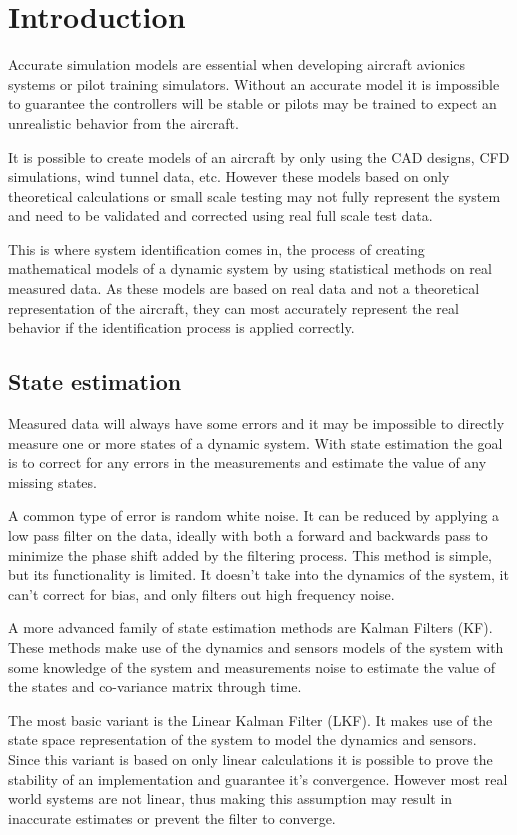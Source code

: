 \section{Introduction}
Accurate simulation models are essential when developing aircraft avionics systems or pilot training simulators. Without an accurate model it is impossible to guarantee the controllers will be stable or pilots may be trained to expect an unrealistic behavior from the aircraft.

It is possible to create models of an aircraft by only using the CAD designs, CFD simulations, wind tunnel data, etc. However these models based on only theoretical calculations or small scale testing may not fully represent the system and need to be validated and corrected using real full scale test data. 

This is where system identification comes in, the process of creating mathematical models of a dynamic system by using statistical methods on real measured data. As these models are based on real data and not a theoretical representation of the aircraft, they can most accurately represent the real behavior if the identification process is applied correctly.

\subsection{State estimation}
Measured data will always have some errors and it may be impossible to directly measure one or more states of a dynamic system. With state estimation the goal is to correct for any errors in the measurements and estimate the value of any missing states. 

A common type of error is random white noise. It can be reduced by applying a low pass filter on the data, ideally with both a forward and backwards pass to minimize the phase shift added by the filtering process. This method is simple, but its functionality is limited. It doesn't take into the dynamics of the system, it can't correct for bias, and only filters out high frequency noise.

A more advanced family of state estimation methods are Kalman Filters (KF). These methods make use of the dynamics and sensors models of the system with some knowledge of the system and measurements noise to estimate the value of the states and co-variance matrix through time.

The most basic variant is the Linear Kalman Filter (LKF). It makes use of the state space representation of the system to model the dynamics and sensors. Since this variant is based on only linear calculations it is possible to prove the stability of an implementation and guarantee it's convergence. However most real world systems are not linear, thus making this assumption may result in inaccurate estimates or prevent the filter to converge.

